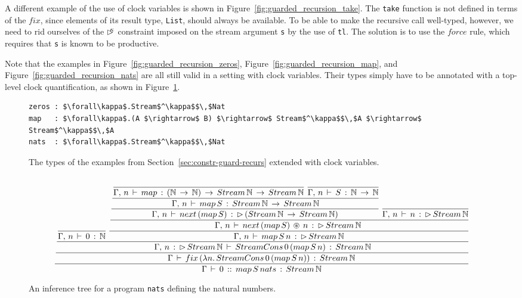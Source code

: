 A different example of the use of clock variables is shown in Figure~\ref{fig:guarded_recursion_take}. The \texttt{take} function is not defined in terms of the $fix$, since elements of its result type, \texttt{List}, should always be available. To be able to make the recursive call well-typed, however, we need to rid ourselves of the $\rhd^{\!\!\!\kappa}$ constraint imposed on the stream argument \texttt{s} by the use of \texttt{tl}. The solution is to use the $force$ rule, which requires that \texttt{s} is known to be productive. 

Note that the examples in Figure~\ref{fig:guarded_recursion_zeros}, Figure~\ref{fig:guarded_recursion_map}, and Figure~\ref{fig:guarded_recursion_nats} are all still valid in a setting with clock variables. Their types simply have to be annotated with a top-level clock quantification, as shown in Figure~\ref{fig:guarded_recursion_quantified_examples}.

\begin{figure}
\begin{lstlisting}[mathescape]
zeros : $\forall\kappa$.Stream$^\kappa$$\,$Nat
map   : $\forall\kappa$.(A $\rightarrow$ B) $\rightarrow$ Stream$^\kappa$$\,$A $\rightarrow$ Stream$^\kappa$$\,$A
nats  : $\forall\kappa$.Stream$^\kappa$$\,$Nat
\end{lstlisting}
\caption{The types of the examples from Section~\ref{sec:constr-guard-recurs} extended with clock variables.}
\label{fig:guarded_recursion_quantified_examples}
\end{figure}

\begin{landscape}
\begin{figure}
\[
\cfrac { \cfrac { \cfrac { \cfrac {  }{ \Gamma ,\, n\, \vdash \, 0\, :\, \mathbb{N} } \, \, \cfrac { \cfrac { \cfrac { \cfrac { \cfrac {  }{ \Gamma ,\, n\, \vdash \, map\, :\, (\mathbb{N}\, \rightarrow \, \mathbb{N})\, \rightarrow \, Stream\, \mathbb{N}\, \rightarrow \, Stream\, \mathbb{N} } \, \, \cfrac {  }{ \Gamma ,\, n\, \vdash \, S\, :\, \mathbb{N}\, \rightarrow \, \mathbb{N} }  }{ \Gamma ,\, n\, \vdash \, map\, S\, :\, Stream\, \mathbb{N}\, \rightarrow \, Stream\, \mathbb{N} }  }{ \Gamma ,\, n\, \vdash \, next\, (map\, S)\, :\, \rhd \, (Stream\, \mathbb{N}\, \rightarrow \, Stream\, \mathbb{N}) } \, \, \cfrac {  }{ \Gamma ,\, n\, \vdash \, n\, :\, \rhd \, Stream\, \mathbb{N} }  }{ \Gamma ,\, n\, \vdash \, next\, (map\, S)\, \circledast \, n\, :\, \rhd \, Stream\, \mathbb{N}\, \,  }  }{ \Gamma ,\, n\, \vdash \, map\, S\, n\, :\, \rhd \, Stream\, \mathbb{N} }  }{ \Gamma ,\, n\, :\, \rhd \, Stream\, \mathbb{N}\, \vdash \, StreamCons\, 0\, (map\, S\, n)\, :\, Stream\, \mathbb{N} }  }{ \Gamma \, \vdash \, fix\, (\lambda n.\, StreamCons\, 0\, (map\, S\, n))\, :\, Stream\, \mathbb{N}\,  }  }{ \Gamma \, \vdash \, 0\, ::\, map\, S\, nats\, :\, Stream\, \mathbb{N} } 
\]
\caption{An inference tree for a program \texttt{nats} defining the natural numbers.}
\end{figure}
\end{landscape}

